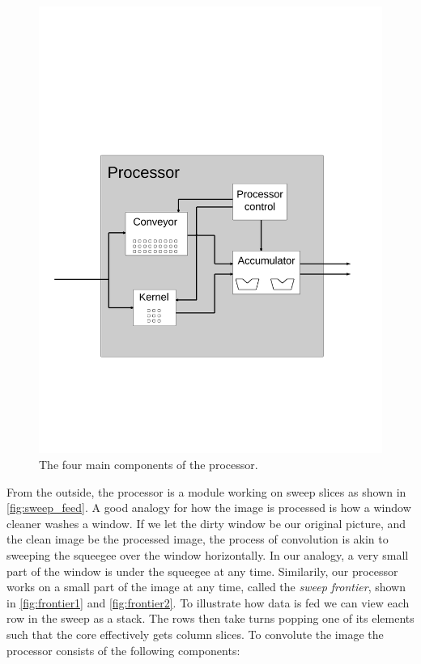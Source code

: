 \begin{figure}[h!]
    \includegraphics[width=\linewidth]{img/processor.png}
    \caption{The four main components of the processor.}
    \label{fig:convolution_processor}
\end{figure}

From the outside, the processor is a module working on sweep slices as shown in \ref{fig:sweep_feed}.
A good analogy for how the image is processed is how a window cleaner washes a window.
If we let the dirty window be our original picture, and the clean image be the processed image, the process of convolution is akin to sweeping the squeegee over the window horizontally.
In our analogy, a very small part of the window is under the squeegee at any time.
Similarily, our processor works on a small part of the image at any time, called the \textit{sweep frontier}, shown in \ref{fig:frontier1} and \ref{fig:frontier2}.
To illustrate how data is fed we can view each row in the sweep as a stack.
The rows then take turns popping one of its elements such that the core effectively gets column slices.
To convolute the image the processor consists of the following components:

